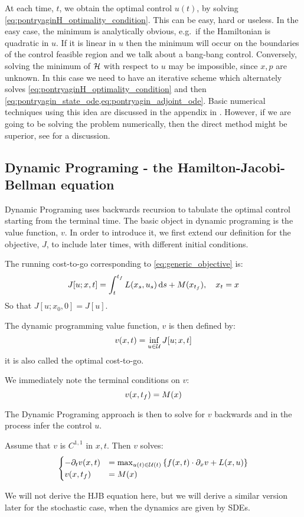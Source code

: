 At each time, $t$, we obtain the optimal control $u(t)$, by solving
\cref{eq:pontryaginH_optimality_condition}. This can be easy, hard or useless.
In the easy case, the minimum is analytically obvious, e.g.\ if the Hamiltonian
is quadratic in $u$. If it is linear in $u$ then the minimum will occur on the
boundaries of the control feasible region and we talk about a bang-bang
control. Conversely, solving the minimum of ${ \mathcal{H} }$ with respect to $u$ may be impossible,
since $x,p$ are unknown. In this case we need to have an iterative scheme which
alternately solves
\cref{eq:pontryaginH_optimality_condition} 
and then \cref{eq:pontryagin_state_ode,eq:pontryagin_adjoint_ode}. Basic
numerical techniques using this idea are discussed in the appendix in
\cite{Kirk2004}. However, if we are going to be solving the problem numerically,
then the direct method might be superior, see \cite{Ross2005} for a discussion.
   


\subsection{Dynamic Programing - the Hamilton-Jacobi-Bellman equation} 
Dynamic Programing uses backwards recursion to tabulate the optimal control
starting from the terminal time. The basic object in dynamic programing is the
value function, $v$. In order to introduce it, we first extend our definition
for the objective, $J$, to include later times, with different initial
conditions.

The running cost-to-go corresponding to
\cref{eq:generic_objective} is:
\begin{equation}
J[u; x, t] = \int_t^{ t_f } L(x_s, u_s) \, \mathrm{d} s + M(x_{ t_f }), \quad x_t = x
\label{eq:generic_cost_to_go_deterministic} 
\end{equation}
So that $J[u; x_0, 0] = J[u]$. 

The dynamic programming value function, $v$ is then defined by:
$$
v(x,t) = \inf_{u \in { \mathcal{U} }} J[u; x,t] 
$$
it is also called the optimal cost-to-go. 

We immediately note the terminal conditions on $v$:
\begin{equation}
v(x,{ t_f } ) = M(x)
\end{equation}


The Dynamic Programing approach is then to solve for $v$ backwards and in the
process infer the control $u$.
\begin{thm} Assume that $v$ is $C^{1,1}$ in
$x,t$. Then $v$ solves:
\begin{equation}
\begin{cases}
-{\partial}_t v(x,t) &= \max_{u(t) \in { \mathcal{U} }(t)} \left\{ f(x,t) \cdot {\partial}_x v +
L(x,u) \right\}
\\
v(x,{ t_f }) &= M(x)
\end{cases}
\end{equation}
\end{thm}
We will not derive the HJB equation here, but we will derive a similar version
later for the stochastic case, when the dynamics are given by SDEs. 

